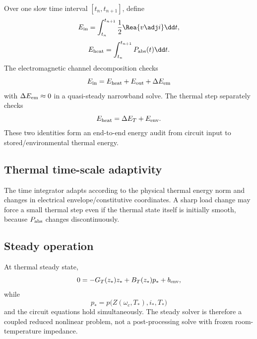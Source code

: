 Over one slow time interval $[t_n,t_{n+1}]$, define
\[
 E_{\rm in}
 =
 \int_{t_n}^{t_{n+1}}
 \frac12\Rea\{v\adj i\}\dd t,
\]
\[
 E_{\rm heat}
 =
 \int_{t_n}^{t_{n+1}}
 P_{\rm abs}(t)\dd t.
\]
The electromagnetic channel decomposition checks
\[
 E_{\rm in}
 =
 E_{\rm heat}
 +E_{\rm out}
 +\Delta E_{\rm em}
\]
with $\Delta E_{\rm em}\approx0$ in a quasi-steady narrowband solve.
The thermal step separately checks
\[
 E_{\rm heat}
 =
 \Delta E_T+E_{\rm env}.
\]
These two identities form an end-to-end energy audit from circuit input to
stored/environmental thermal energy.

\subsection{Thermal time-scale adaptivity}

The time integrator adapts according to the physical thermal energy norm and
changes in electrical envelope/constitutive coordinates. A sharp load change
may force a small thermal step even if the thermal state itself is initially
smooth, because $P_{\rm abs}$ changes discontinuously.

\subsection{Steady operation}

At thermal steady state,
\[
  0=-G_T(z_\ast)z_\ast+B_T(z_\ast)p_\ast+b_{\rm env},
\]
while
\[
  p_\ast
  =
  p\big(
    Z(\omega_c,T_\ast),
    i_\ast,
    T_\ast
  \big)
\]
and the circuit equations hold simultaneously. The steady solver is therefore
a coupled reduced nonlinear problem, not a post-processing solve with frozen
room-temperature impedance.
